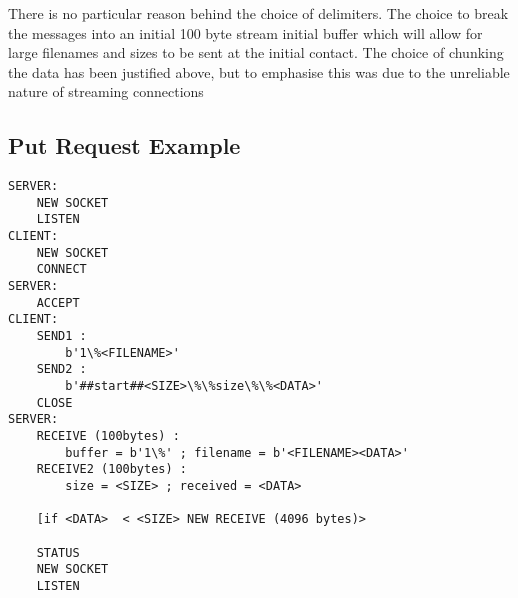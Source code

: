 \documentclass[english,course]{Notes}
\begin{document}
\par{There is no particular reason behind the choice of delimiters. The choice to break the messages into an initial 100 byte stream initial buffer which will allow for large filenames and sizes to be sent at the initial contact. The choice of chunking the data has been justified above, but to emphasise this was due to the unreliable nature of streaming connections}
\subsection{Put Request Example}
\newpage
\begin{lstlisting}
SERVER: 
	NEW SOCKET
	LISTEN
CLIENT:
	NEW SOCKET
	CONNECT
SERVER:
	ACCEPT
CLIENT:
	SEND1 : 
		b'1\%<FILENAME>'
	SEND2 : 
		b'##start##<SIZE>\%\%size\%\%<DATA>'
	CLOSE
SERVER:
	RECEIVE (100bytes) : 
		buffer = b'1\%' ; filename = b'<FILENAME><DATA>'
	RECEIVE2 (100bytes) : 
		size = <SIZE> ; received = <DATA>
	
	[if <DATA>  < <SIZE> NEW RECEIVE (4096 bytes)>
	
	STATUS
	NEW SOCKET
	LISTEN
\end{lstlisting}
 
\end{document}
